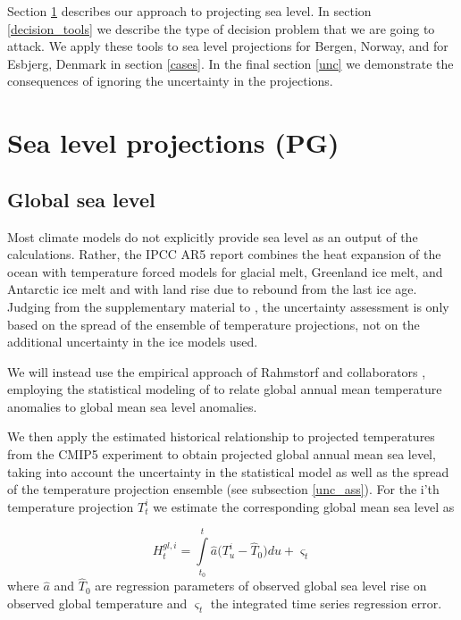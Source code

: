 \documentclass[draft,linenumbers]{agujournal}
\begin{document}
Section \ref{sealevelproj} describes our approach to projecting sea level. In section \ref{decision_tools} we describe the type of decision problem that we are going to attack. We apply these tools to  sea level projections for Bergen, Norway, and for Esbjerg, Denmark 
in section \ref{cases}.  In the final section \ref{unc}  we demonstrate the consequences of ignoring the uncertainty in the projections.

\section{Sea level projections {\color{blue} (PG)}}

\label{sealevelproj}

\subsection{Global sea level}
Most climate models do not explicitly provide sea level as an output of the calculations. Rather, the IPCC AR5 report \citep[ch.~13]{ipcc} combines the heat expansion of the ocean with temperature forced models for glacial melt, Greenland ice melt, and Antarctic ice melt and with land rise due to rebound from the last ice age. Judging from the supplementary material to \citet[ch.~13]{ipcc}, the uncertainty assessment is only based on the spread of the ensemble of temperature projections, not on the additional uncertainty in the ice models used.

We will instead use the empirical approach of Rahmstorf and collaborators \citep{Rahmstorf07,Rahmstorf11}, employing the statistical modeling of \citet{Bolin2014a} to relate global annual mean temperature anomalies to global mean sea level anomalies. 


We then apply the estimated historical relationship to projected temperatures from the CMIP5 experiment \citep{cmip5} to obtain projected global annual mean sea level, taking into account the uncertainty in the statistical model as well as the spread of the temperature projection ensemble (see subsection \ref{unc_ass}). 
For the i'th temperature projection $T_t^i$ we estimate the corresponding global mean sea level as

\[H_t^{gl,i} = \int\limits_{{t_0}}^t {{\hat a} (T_u^i - {{\hat T}_0}} )du + {\varsigma _t}\]
where ${\hat a}$ and ${\hat T}_0$ are regression parameters of observed global sea level  rise on observed global temperature and $\varsigma_t$ the integrated time series regression error.
\end{document}
